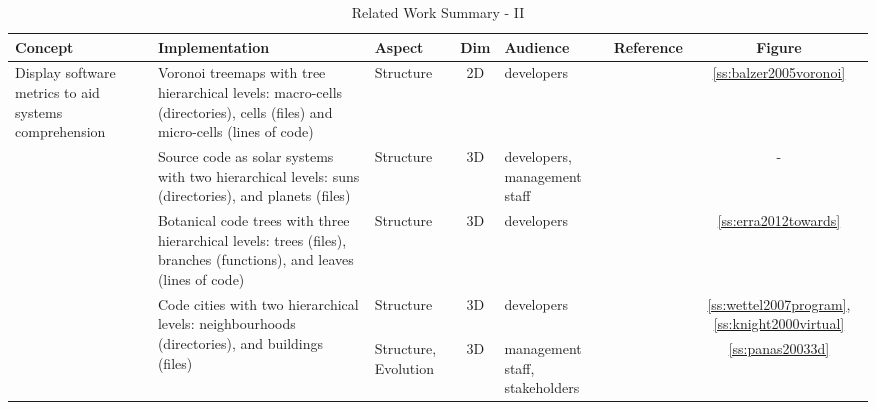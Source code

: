 \begin{landscape}
    \begin{longtable}{p{.30\textheight} p{.45\textheight} p{.13\textheight} c p{.20\textheight} p{.20\textheight} c}
    \caption{Related Work Summary - II}\label{tab:relwork2}\endfirsthead
    \textbf{Concept} & \textbf{Implementation} & \textbf{Aspect} & \textbf{Dim} & \textbf{Audience} & \textbf{Reference}
    & \textbf{Figure} \\ \hline
    \hline
    \multirow{13}{*}{\begin{minipage}{.3\textheight}Display software metrics to
    aid systems comprehension\end{minipage}}
    & Voronoi treemaps with tree hierarchical levels: macro-cells (directories),
    cells (files) and micro-cells (lines of code) & Structure & 2D & developers & \cite{balzer2005voronoi} & \ref{ss:balzer2005voronoi} \\ \cline{2-7}
    & Source code as solar systems with two hierarchical levels: suns (directories), and planets (files) & Structure & 3D & developers, management staff  & \cite{graham2004solar} & - \\ \cline{2-7} & Botanical code trees with three hierarchical levels: trees (files),
    branches (functions), and leaves (lines of code)  & Structure & 3D &
    developers & \cite{erra2012towards} & \ref{ss:erra2012towards} \\
    \cline{2-7} &
    \multirow{4}{*}{\begin{minipage}{.45\textheight}Code cities with two
    hierarchical levels: neighbourhoods (directories), and buildings (files)\end{minipage}} & Structure & 3D & developers &
    \cite{wettel2007program,knight2000virtual} &
    \ref{ss:wettel2007program}, \ref{ss:knight2000virtual}
    \\ \cline{3-7}
    & & Structure, Evolution & 3D & management staff,
    stakeholders & \cite{panas20033d} & \ref{ss:panas20033d} \\ \hline
\end{longtable}
\end{landscape}

